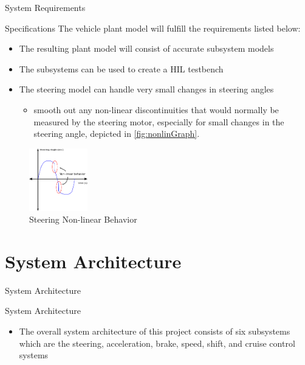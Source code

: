 \documentclass{beamer}
\begin{document}
\begin{frame}{System Requirements}
  \begin{block}{Specifications}
    The vehicle plant model will fulfill the requirements listed below:
\begin{itemize}
    \item The resulting plant model will consist of accurate subsystem models
    \item The subsystems can be used to create a HIL testbench
    \item The steering model can handle very small changes in steering angles
    \begin{itemize}
    		\item smooth out any non-linear discontinuities that would normally be measured by the steering motor, especially for small changes in the steering angle, depicted in \autoref{fig:nonlinGraph}.
    \end{itemize}
\end{itemize}
\begin{figure}[h]
    \centering
    \captionsetup{justification=centering, margin=3cm}
    \includegraphics[width=1in]{figs/inkscape/nonlinearBehavior}
    \caption{Steering Non-linear Behavior}
    \label{fig:nonlinGraph}
\end{figure}
  \end{block}
\end{frame}


\section{System Architecture}

\begin{frame}{System Architecture}
  \begin{block}{System Architecture}
 \begin{itemize}
        \item The overall system architecture of this project consists of six subsystems which are the steering, acceleration, brake, speed, shift, and cruise control systems
\end{itemize}
  \end{block}
\end{frame}
\end{document}
